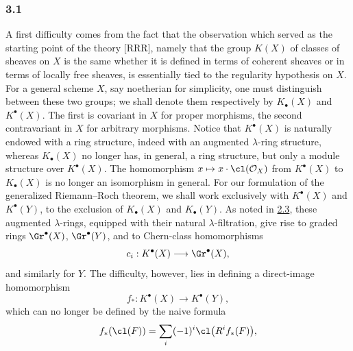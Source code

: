 \subsubsection*{3.1}
A first difficulty comes from the fact that the observation which served as the starting point of the theory [RRR], namely that the group $K(X)$ of classes of sheaves on $X$ is the same whether it is defined in terms of coherent sheaves or in terms of locally free sheaves, is essentially tied to the regularity hypothesis on $X$. For a general scheme $X$, say noetherian for simplicity, one must distinguish between these two groups; we shall denote them respectively by $K_\bullet(X)$ and $K^\bullet(X)$. The first is covariant in $X$ for proper morphisms, the second contravariant in $X$ for arbitrary morphisms. Notice that $K^\bullet(X)$ is naturally endowed with a ring structure, indeed with an augmented $\lambda$-ring structure, whereas $K_\bullet(X)$ no longer has, in general, a ring structure, but only a module structure over $K^\bullet(X)$. The homomorphism $x\mapsto x\cdot\cl(\mathcal O_X)$ from $K^\bullet(X)$ to $K_\bullet(X)$ is no longer an isomorphism in general. For our formulation of the generalized Riemann--Roch theorem, we shall work exclusively with $K^\bullet(X)$ and $K^\bullet(Y)$, to the exclusion of $K_\bullet(X)$ and $K_\bullet(Y)$. As noted in \hyperlink{sga6.e00.sec.2.3}{2.3}, these augmented $\lambda$-rings, equipped with their natural $\lambda$-filtration, give rise to graded rings $\Gr^\bullet(X)$, $\Gr^\bullet(Y)$, and to Chern-class homomorphisms
\[
c_i:K^\bullet(X)\longrightarrow \Gr^\bullet(X),
\]
and similarly for $Y$. The difficulty, however, lies in defining a direct-image homomorphism
\begin{equation}\tag{3.1}
f_*:K^\bullet(X)\longrightarrow K^\bullet(Y),
\end{equation}
which can no longer be defined by the naive formula
\[
f_*(\cl(F))=\sum_i(-1)^i\cl\bigl(R^if_*(F)\bigr),
\]
